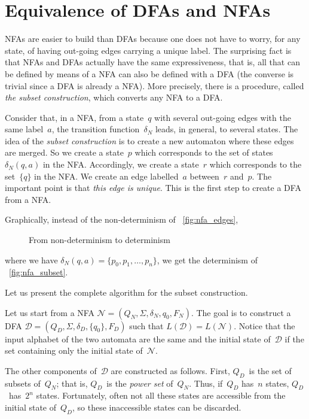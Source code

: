 \section{Equivalence of DFAs and NFAs}

NFAs are easier to build than DFAs because one does not have to worry,
for any state, of having out-going edges carrying a unique label. The
surprising fact is that NFAs and DFAs actually have the same
expressiveness, that is, all that can be defined by means of a NFA can
also be defined with a DFA (the converse is trivial since a DFA is
already a NFA). More precisely, there is a procedure, called \emph{the
  subset construction}, which converts any NFA to a DFA.

Consider that, in a NFA, from a state~\(q\) with several out-going
edges with the same label~\(a\), the transition function~\(\delta_N\)
leads, in general, to several states. The idea of the \emph{subset
  construction} is to create a new automaton where these edges are
merged. So we create a state~\(p\) which corresponds to the set of
states \(\delta_N (q,a)\) in the NFA. Accordingly, we create a
state~\(r\) which corresponds to the set~\(\{q\}\) in the NFA. We
create an edge labelled~\(a\) between~\(r\) and~\(p\). The important
point is that \emph{this edge is unique}. This is the first step to
create a DFA from a NFA.

Graphically, instead of the non-determinism of
\fig~\vref{fig:nfa_edges},
\begin{figure}
\centering
{}
\qquad
{}
\caption{From non-determinism to determinism}
\end{figure}
where we have \(\delta_N (q, a) = \{p_0, p_1, \dots, p_n\}\), we get
the determinism of \fig~\vref{fig:nfa_subset}.

Let us present the complete algorithm for the subset construction.

Let us start from a NFA \(\mathcal{N} = (Q_N, \Sigma, \delta_N, q_0,
F_N)\). The goal is to construct a DFA \(\mathcal{D} = (Q_D, \Sigma,
\delta_D, \{q_0\}, F_D)\) such that \(L(\mathcal{D}) =
L(\mathcal{N})\). Notice that the input alphabet of the two automata
are the same and the initial state of~\(\mathcal{D}\) if the set
containing only the initial state of~\(\mathcal{N}\).

The other components of~\(\mathcal{D}\) are constructed as
follows. First, \(Q_D\)~is the set of subsets of~\(Q_N\); that is,
\(Q_D\)~is the \emph{power set} of~\(Q_N\). Thus, if~\(Q_D\) has~\(n\)
states, \(Q_D\)~has~\(2^n\) states. Fortunately, often not all these
states are accessible from the initial state of~\(Q_D\), so these
inaccessible states can be discarded.


